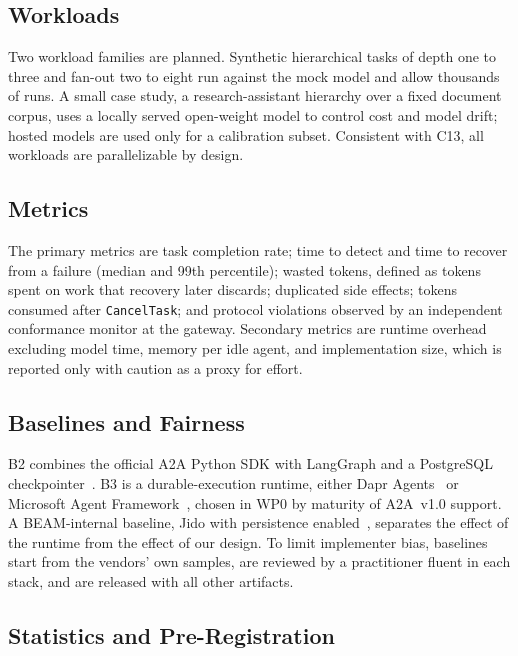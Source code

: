 \documentclass[conference,letterpaper]{IEEEtran}
\newcommand{\code}[1]{\texttt{#1}}
\begin{document}
\subsection{Workloads}

Two workload families are planned. Synthetic hierarchical tasks of depth one
to three and fan-out two to eight run against the mock model and allow
thousands of runs. A small case study, a research-assistant hierarchy over a
fixed document corpus, uses a locally served open-weight model to control
cost and model drift; hosted models are used only for a calibration subset.
Consistent with C13, all workloads are parallelizable by design.

\subsection{Metrics}

The primary metrics are task completion rate; time to detect and time to
recover from a failure (median and 99th percentile); wasted tokens, defined
as tokens spent on work that recovery later discards; duplicated side
effects; tokens consumed after \code{CancelTask}; and protocol violations
observed by an independent conformance monitor at the gateway. Secondary
metrics are runtime overhead excluding model time, memory per idle agent,
and implementation size, which is reported only with caution as a proxy for
effort.

\subsection{Baselines and Fairness}

B2 combines the official A2A Python SDK with LangGraph and a PostgreSQL
checkpointer~\cite{langgraph-durable}. B3 is a durable-execution runtime,
either Dapr Agents~\cite{dapr-agents} or Microsoft Agent
Framework~\cite{maf-vsm}, chosen in WP0 by maturity of A2A~v1.0 support. A
BEAM-internal baseline, Jido with persistence enabled~\cite{jido-storage},
separates the effect of the runtime from the effect of our design. To limit
implementer bias, baselines start from the vendors' own samples, are
reviewed by a practitioner fluent in each stack, and are released with all
other artifacts.

\subsection{Statistics and Pre-Registration}\label{sec:stats}
\end{document}
